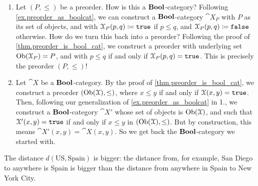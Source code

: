 \documentclass[7Sketches]{subfiles}
\begin{document}
{
  \begin{enumerate}
    \item Let $(P, \le)$ be a preorder. How is this a $\mathbf{Bool}$-category? Following
      \cref{ex.preorder_as_boolcat}, we can construct a $\mathbf{Bool}$-category $\cat{X}_P$
      with $P$ as its set of objects, and with $\mathcal{X}_P(p,q)\coloneqq \mathtt{true}$ if $p \le q$,
      and $\mathcal{X}_P(p,q)\coloneqq \mathtt{false}$ otherwise. How do we turn this back into a preorder?
      Following the proof of \cref{thm.preorder_is_bool_cat}, we construct a preorder
      with underlying set $\operatorname{Ob}(\mathcal{X}_P) = P$, and with $p \le q$ if and only if
      $\mathcal{X}_P(p,q) = \mathtt{true}$. This is precisely the preorder $(P,\le)$!
    \item Let $\cat{X}$ be a $\mathbf{Bool}$-category. By the proof of
      \cref{thm.preorder_is_bool_cat}, we construct a preorder
      $(\operatorname{Ob}(\mathcal{X}), \le)$, where $x \le y$ if and only if $\mathcal{X}(x,y) =
      \mathtt{true}$. Then, following our generalization of
      \cref{ex.preorder_as_boolcat} in 1., we construct a $\mathbf{Bool}$-category
      $\cat{X}'$ whose set of objects is $\operatorname{Ob}(\mathcal{X})$, and such that
      $\mathcal{X}'(x,y) = \mathtt{true}$ if and only if $x \le y$ in $(\operatorname{Ob}(\mathcal{X}), \le)$.
      But by construction, this means $\cat{X}'(x,y) = \cat{X}(x,y)$. So we get
      back the $\mathbf{Bool}$-category we started with.
  \end{enumerate}
}

{
The distance $d(\mathrm{US},\mathrm{Spain})$ is bigger: the distance from, for
example, San Diego to anywhere is Spain is bigger than the distance from
anywhere in Spain to New York City.
}
\end{document}
